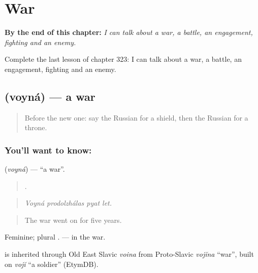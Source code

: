 
\chapter{War}
\label{ch:ru-war}

\begin{chapteropening}
\textbf{By the end of this chapter:} \emph{I can talk about a war, a battle, an engagement, fighting and an enemy.}

Complete the last lesson of chapter 323: I can talk about a war, a battle, an engagement, fighting and an enemy.
\end{chapteropening}

\section[\texorpdfstring{\ru{война} (voyná)}{война (voyná)}]{ (voyná) — a war}

\label{lesson:RU-C323-voyna}



\begin{quote}
Before the new one: say the Russian for a shield, then the Russian for a throne.
\end{quote}

\subsection*{You'll want to know: }
\textbf{} (\emph{voyná}) — \textquotedblleft{}a war\textquotedblright{}.

\begin{quote}
   .
\end{quote}

\begin{quote}
\emph{Voyná prodolzhálas pyat let.}
\end{quote}

\begin{quote}
The war went on for five years.
\end{quote}

Feminine; plural \emph{}. \emph{ } — in the war.

\begin{cousinweb}
\emph{} is inherited through Old East Slavic \emph{voina} from Proto-Slavic \emph{vojĭna} \textquotedblleft{}war\textquotedblright{}, built on \emph{vojĭ} \textquotedblleft{}a soldier\textquotedblright{} (EtymDB).
\end{cousinweb}

